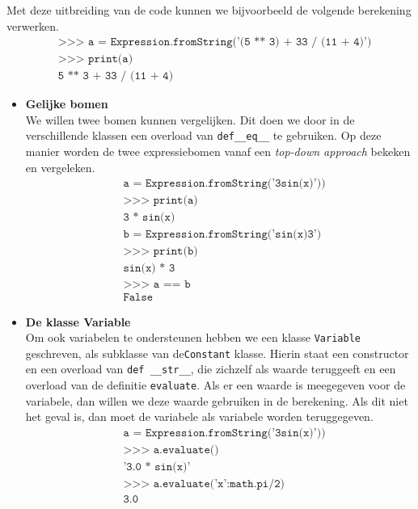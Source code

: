 \documentclass[12pt]{article}
\begin{document}
\vspace{1pc}
Met deze uitbreiding van de code kunnen we bijvoorbeeld de volgende berekening verwerken.
\begin{align*}
& \texttt{>>> a = Expression.fromString('(5 ** 3) + 33 / (11 + 4)')}\\
& \texttt{>>> print(a)}\\
& \texttt{5 ** 3 + 33 / (11 + 4)}
\end{align*} \vspace{0.5pc}
\begin{itemize}
\item \textbf{Gelijke bomen} \\
We willen twee bomen kunnen vergelijken. Dit doen we door in de verschillende klassen een overload van \texttt{def\_\_eq\_\_} te gebruiken. Op deze manier worden de twee expressiebomen vanaf een \textit{top-down approach} bekeken en vergeleken. 
\begin{align*}
&\texttt{a = Expression.fromString('3sin(x)'))}\\
&\texttt{>>> print(a)}\\
&\texttt{3 * sin(x)}\\
&\texttt{b = Expression.fromString('sin(x)3')}\\
&\texttt{>>> print(b)}\\
&\texttt{sin(x) * 3}\\
&\texttt{>>> a == b}\\
&\texttt{False}
\end{align*}


\item \textbf{De klasse Variable} \\
Om ook variabelen te ondersteunen hebben we een klasse \texttt{Variable} geschreven, als subklasse van de\texttt{Constant} klasse. Hierin staat een constructor en een overload van  \texttt{def \_\_str\_\_}, die zichzelf als waarde teruggeeft en een overload van de definitie \texttt{evaluate}. Als er een waarde is meegegeven voor de variabele, dan willen we deze waarde gebruiken in de berekening. Als dit niet het geval is, dan moet de variabele als variabele worden teruggegeven.
\begin{align*}
&\texttt{a = Expression.fromString('3sin(x)'))}\\
&\texttt{>>> a.evaluate()}\\
&\texttt{'3.0 * sin(x)'}\\
&\texttt{>>> a.evaluate({'x':math.pi/2})}\\
&\texttt{3.0}\\
\end{align*}


\end{itemize}
\end{document}

